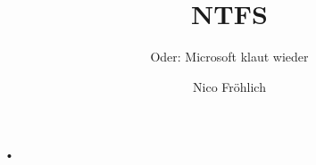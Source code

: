 \documentclass[12pt]{beamer}
\author{Nico Fröhlich}
\title{NTFS}
\subtitle{Oder: Microsoft klaut wieder}
\begin{document}
\begin{frame}
\titlepage
\end{frame}

\begin{frame}{•}

\end{frame}
\end{document}
